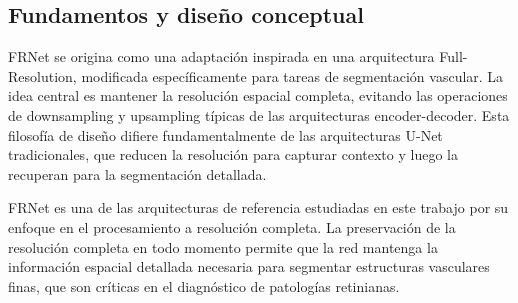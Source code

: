 \documentclass[11pt,a4paper]{report} %
\begin{document}
\subsection{Fundamentos y diseño conceptual}
FRNet se origina como una adaptación inspirada en una arquitectura Full-Resolution, modificada específicamente para tareas de segmentación vascular. La idea central es mantener la resolución espacial completa, evitando las operaciones de downsampling y upsampling típicas de las arquitecturas encoder-decoder. Esta filosofía de diseño difiere fundamentalmente de las arquitecturas U-Net tradicionales, que reducen la resolución para capturar contexto y luego la recuperan para la segmentación detallada.

FRNet es una de las arquitecturas de referencia estudiadas en este trabajo por su enfoque en el procesamiento a resolución completa. La preservación de la resolución completa en todo momento permite que la red mantenga la información espacial detallada necesaria para segmentar estructuras vasculares finas, que son críticas en el diagnóstico de patologías retinianas.
\end{document}
